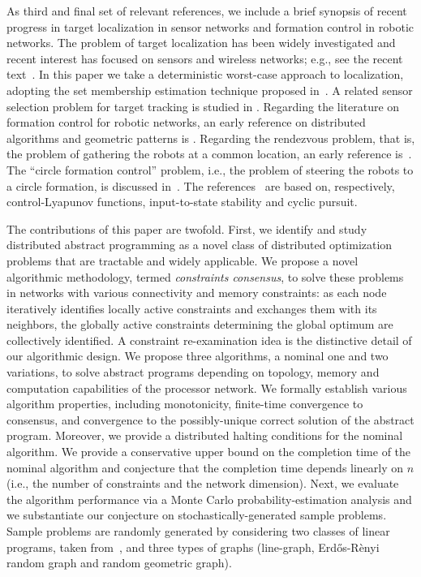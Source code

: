 \documentclass[onecolumn,journal,letterpaper]{IEEEtran}
\begin{document}
As third and final set of relevant references, we include a brief synopsis
of recent progress in target localization in sensor networks and formation
control in robotic networks.  The problem of target localization has been
widely investigated and recent interest has focused on sensors and wireless
networks; e.g., see the recent text~\cite{FZ-LG:04}. In this paper we take
a deterministic worst-case approach to localization, adopting the set
membership estimation technique proposed in~\cite{AG-AV:01}. A related
sensor selection problem for target tracking is studied in \cite{VI-RB:06}.
Regarding the literature on formation control for robotic networks, an
early reference on distributed algorithms and geometric patterns is
\cite{IS-MY:99}.  Regarding the rendezvous problem, that is, the problem of
gathering the robots at a common location, an early reference
is~\cite{HA-YO-IS-MY:99}.  The ``circle formation control'' problem, i.e.,
the problem of steering the robots to a circle formation, is discussed
in~\cite{XD-AK:02}.  The
references~\cite{ME-XH:01b,HGT-GJP-VK:04,JAM-MEB-BAF:04c} are based on,
respectively, control-Lyapunov functions, input-to-state stability and
cyclic pursuit.

The contributions of this paper are twofold.  First, we identify and study
distributed abstract programming as a novel class of distributed
optimization problems that are tractable and widely applicable.  We propose
a novel algorithmic methodology, termed \emph{constraints consensus}, to
solve these problems in networks with various connectivity and memory
constraints: as each node iteratively identifies locally active constraints
and exchanges them with its neighbors, the globally active constraints
determining the global optimum are collectively identified. A constraint
re-examination idea is the distinctive detail of our algorithmic design.
We propose three algorithms, a nominal one and two variations, to solve
abstract programs depending on topology, memory and computation
capabilities of the processor network. We formally establish various algorithm properties, including monotonicity,
finite-time convergence to consensus, and convergence to the
possibly-unique correct solution of the abstract program.  Moreover, we
provide a distributed halting conditions for the nominal algorithm.
We provide a conservative upper bound on the completion time of the nominal
algorithm and conjecture that the completion time depends linearly on $n$
(i.e., the number of constraints and the network dimension).  Next, we
evaluate the algorithm performance via a Monte Carlo probability-estimation
analysis and we substantiate our conjecture on stochastically-generated
sample problems. Sample problems are randomly generated by considering two
classes of linear programs, taken from~\cite{RS:87}, and three types of
graphs (line-graph, Erd\H{o}s-R\`enyi random graph and random geometric
graph).
\end{document}
